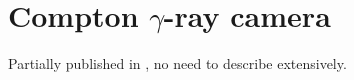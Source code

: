 \documentclass[a4paper,11pt,titlepage,twoside]{book}
\begin{document}
\section{Compton $\gamma$-ray camera}

Partially published in \cite{baca2019timepix}, no need to describe extensively.

\end{document}
